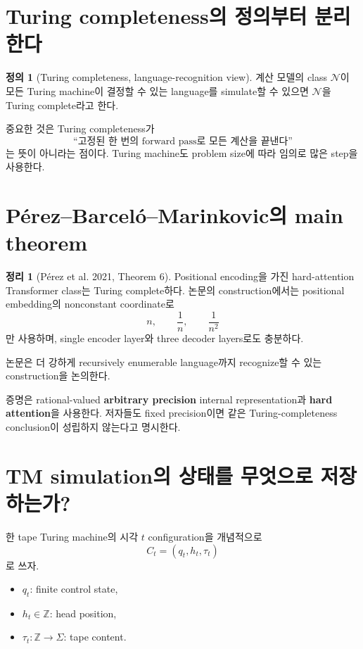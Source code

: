 \documentclass[11pt,a4paper,oneside,openany]{memoir}
\theoremstyle{definition}
\newtheorem{definition}{정의}[chapter]
\newtheorem{theorem}{정리}[chapter]
\begin{document}
\section{Turing completeness의 정의부터 분리한다}

\begin{definition}[Turing completeness, language-recognition view]
계산 모델의 class $\mathcal N$이 모든 Turing machine이 결정할 수 있는 language를 simulate할 수 있으면 $\mathcal N$을 Turing complete라고 한다.
\end{definition}

중요한 것은 Turing completeness가
\[
\text{``고정된 한 번의 forward pass로 모든 계산을 끝낸다''}
\]
는 뜻이 아니라는 점이다. Turing machine도 problem size에 따라 임의로 많은 step을 사용한다.

\section{Pérez--Barceló--Marinkovic의 main theorem}

\begin{theorem}[Pérez et al. 2021, Theorem 6]
Positional encoding을 가진 hard-attention Transformer class는 Turing complete하다. 논문의 construction에서는 positional embedding의 nonconstant coordinate로
\[
n,\qquad \frac1n,\qquad \frac1{n^2}
\]
만 사용하며, single encoder layer와 three decoder layers로도 충분하다.
\end{theorem}

논문은 더 강하게 recursively enumerable language까지 recognize할 수 있는 construction을 논의한다.

\begin{paperbox}
증명은 rational-valued \textbf{arbitrary precision} internal representation과 \textbf{hard attention}을 사용한다. 저자들도 fixed precision이면 같은 Turing-completeness conclusion이 성립하지 않는다고 명시한다.
\end{paperbox}

\section{TM simulation의 상태를 무엇으로 저장하는가?}

한 tape Turing machine의 시각 $t$ configuration을 개념적으로
\[
C_t=(q_t,h_t,\tau_t)
\]
로 쓰자.

\begin{itemize}
  \item $q_t$: finite control state,
  \item $h_t\in\mathbb Z$: head position,
  \item $\tau_t:\mathbb Z\to\Sigma$: tape content.
\end{itemize}
\end{document}
